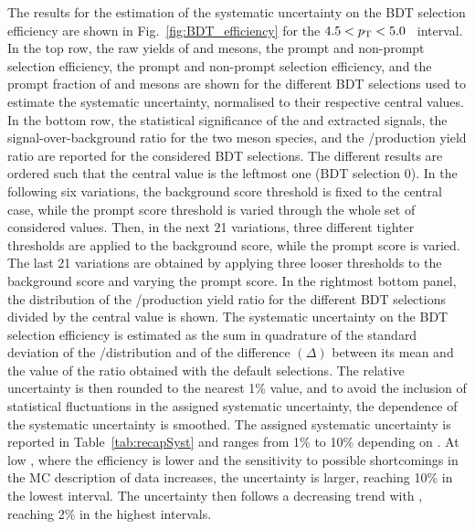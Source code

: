 The results for the estimation of the systematic uncertainty on the BDT selection efficiency are shown in Fig.~\ref{fig:BDT_efficiency} for the \mbox{$4.5<p_\mathrm{T}<5.0$~\gevc} \pt interval. In the top row, the raw yields of \ds and \dpl mesons, the prompt and non-prompt \ds selection efficiency, the prompt and non-prompt \dpl selection efficiency, and the prompt fraction of \ds and \dpl mesons are shown for the different BDT selections used to estimate the systematic uncertainty, normalised to their respective central values. In the bottom row, the statistical significance of the \ds and \dpl extracted signals, the signal-over-background ratio for the two meson species, and the \ds/\dpl production yield ratio are reported for the considered BDT selections. The different results are ordered such that the central value is the leftmost one (BDT selection 0). In the following six variations, the background score threshold is fixed to the central case, while the prompt score threshold is varied through the whole set of considered values. Then, in the next 21 variations, three different tighter thresholds are applied to the background score, while the prompt score is varied. The last 21 variations are obtained by applying three looser thresholds to the background score and varying the prompt score. In the rightmost bottom panel, the distribution of the \ds/\dpl production yield ratio for the different BDT selections divided by the central value is shown. The systematic uncertainty on the BDT selection efficiency is estimated as the sum in quadrature of the standard deviation of the \ds/\dpl distribution and of the difference $(\Delta)$ between its mean and the value of the ratio obtained with the default selections. The relative uncertainty is then rounded to the nearest 1\% value, and to avoid the inclusion of statistical fluctuations in the assigned systematic uncertainty, the \pt dependence of the systematic uncertainty is smoothed. The assigned systematic uncertainty is reported in Table~\ref{tab:recapSyst} and ranges from 1\% to 10\% depending on \pt. At low \pt, where the efficiency is lower and the sensitivity to possible shortcomings in the MC description of data increases, the uncertainty is larger, reaching 10\% in the lowest \pt interval. The uncertainty then follows a decreasing trend with \pt, reaching 2\% in the highest \pt intervals.

